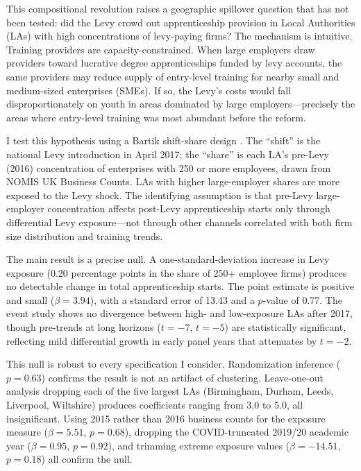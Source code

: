 \documentclass[12pt]{article}
\begin{document}
This compositional revolution raises a geographic spillover question that has not been tested: did the Levy crowd out apprenticeship provision in Local Authorities (LAs) with high concentrations of levy-paying firms? The mechanism is intuitive. Training providers are capacity-constrained. When large employers draw providers toward lucrative degree apprenticeships funded by levy accounts, the same providers may reduce supply of entry-level training for nearby small and medium-sized enterprises (SMEs). If so, the Levy's costs would fall disproportionately on youth in areas dominated by large employers---precisely the areas where entry-level training was most abundant before the reform.

I test this hypothesis using a Bartik shift-share design \citep{goldsmith2020, borusyak2022}. The ``shift'' is the national Levy introduction in April 2017; the ``share'' is each LA's pre-Levy (2016) concentration of enterprises with 250 or more employees, drawn from NOMIS UK Business Counts. LAs with higher large-employer shares are more exposed to the Levy shock. The identifying assumption is that pre-Levy large-employer concentration affects post-Levy apprenticeship starts only through differential Levy exposure---not through other channels correlated with both firm size distribution and training trends.

The main result is a precise null. A one-standard-deviation increase in Levy exposure (0.20 percentage points in the share of 250+ employee firms) produces no detectable change in total apprenticeship starts. The point estimate is positive and small ($\beta = 3.94$), with a standard error of 13.43 and a $p$-value of 0.77. The event study shows no divergence between high- and low-exposure LAs after 2017, though pre-trends at long horizons ($t=-7$, $t=-5$) are statistically significant, reflecting mild differential growth in early panel years that attenuates by $t=-2$.

This null is robust to every specification I consider. Randomization inference ($p = 0.63$) confirms the result is not an artifact of clustering. Leave-one-out analysis dropping each of the five largest LAs (Birmingham, Durham, Leeds, Liverpool, Wiltshire) produces coefficients ranging from 3.0 to 5.0, all insignificant. Using 2015 rather than 2016 business counts for the exposure measure ($\beta = 5.51$, $p = 0.68$), dropping the COVID-truncated 2019/20 academic year ($\beta = 0.95$, $p = 0.92$), and trimming extreme exposure values ($\beta = -14.51$, $p = 0.18$) all confirm the null.
\end{document}
